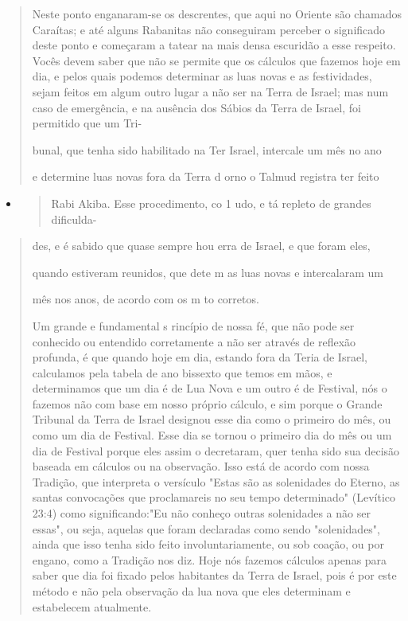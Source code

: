 \begin{quote}
Neste ponto enganaram-se os descrentes, que aqui no Oriente são chamados
Caraítas; e até alguns Rabanitas não conseguiram perceber o signifi­cado
deste ponto e começaram a tatear na mais densa escuridão a esse
respeito. Vocês devem saber que não se permite que os cálculos que
fazemos hoje em dia, e pelos quais podemos determinar as luas novas e as
festividades, sejam feitos em algum outro lugar a não ser na Terra de
Israel; mas num caso de emer­gência, e na ausência dos Sábios da Terra
de Israel, foi permitido que um Tri-

bunal, que tenha sido habilitado na Ter Israel, intercale um mês no ano

e determine luas novas fora da Terra d orno o Talmud registra ter feito
\end{quote}

\begin{itemize}
\item
  \begin{quote}
  Rabi Akiba. Esse procedimento, co 1 udo, e tá repleto de grandes
  dificulda-
  \end{quote}
\end{itemize}

\begin{quote}
des, e é sabido que quase sempre hou erra de Israel, e que foram eles,

quando estiveram reunidos, que dete m as luas novas e intercalaram um

mês nos anos, de acordo com os m to corretos.

Um grande e fundamental s rincípio de nossa fé, que não pode ser
conhecido ou entendido corretamente a não ser através de reflexão
profunda, é que quando hoje em dia, estando fora da Teria de Israel,
calculamos pela ta­bela de ano bissexto que temos em mãos, e
determinamos que um dia é de Lua Nova e um outro é de Festival, nós o
fazemos não com base em nosso próprio cálculo, e sim porque o Grande
Tribunal da Terra de Israel designou esse dia como o primeiro do mês, ou
como um dia de Festival. Esse dia se tornou o primeiro dia do mês ou um
dia de Festival porque eles assim o decretaram, quer tenha sido sua
decisão baseada em cálculos ou na observação. Isso está de acordo com
nossa Tradição, que interpreta o versículo "Estas são as solenidades do
Eterno, as santas convocações que proclamareis no seu tempo determinado"
(Levítico 23:4) como significando:"Eu não conheço outras solenidades a
não ser essas", ou seja, aquelas que foram declaradas como sendo
"solenidades", ainda que isso tenha sido feito involuntariamente, ou sob
coação, ou por enga­no, como a Tradição nos diz. Hoje nós fazemos
cálculos apenas para saber que dia foi fixado pelos habitantes da Terra
de Israel, pois é por este método e não pela observação da lua nova que
eles determinam e estabelecem atualmente.
\end{quote}

